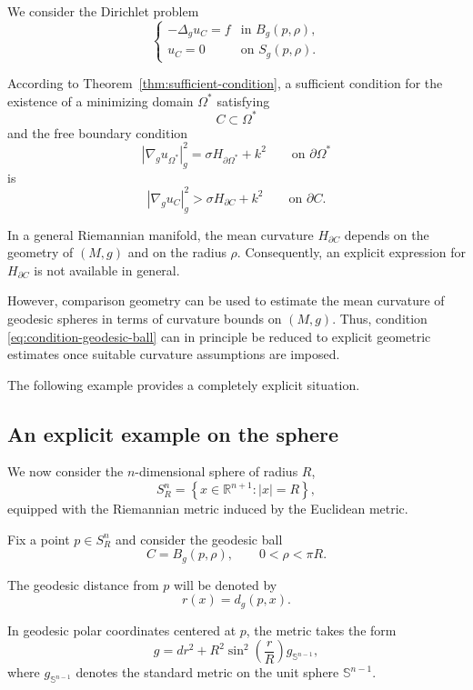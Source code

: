\documentclass{article}
\begin{document}
We consider the Dirichlet problem
\begin{equation}
\begin{cases}
-\Delta_g u_C=f & \text{in }B_g(p,\rho),\\
u_C=0 & \text{on }S_g(p,\rho).
\end{cases}
\label{eq:dirichlet-geodesic-ball}
\end{equation}

According to Theorem~\ref{thm:sufficient-condition}, a sufficient
condition for the existence of a minimizing domain
$\Omega^\ast$ satisfying
\[
C\subset\Omega^\ast
\]
and the free boundary condition
\[
|\nabla_g u_{\Omega^\ast}|_g^2
=
\sigma H_{\partial\Omega^\ast}+k^2
\qquad\text{on }\partial\Omega^\ast
\]
is
\begin{equation}
|\nabla_g u_C|_g^2
>
\sigma H_{\partial C}+k^2
\qquad\text{on }\partial C.
\label{eq:condition-geodesic-ball}
\end{equation}

In a general Riemannian manifold, the mean curvature
$H_{\partial C}$ depends on the geometry of $(M,g)$ and on the radius
$\rho$. Consequently, an explicit expression for
$H_{\partial C}$ is not available in general.

However, comparison geometry can be used to estimate the mean curvature
of geodesic spheres in terms of curvature bounds on $(M,g)$. Thus,
condition \eqref{eq:condition-geodesic-ball} can in principle be reduced
to explicit geometric estimates once suitable curvature assumptions are
imposed.

The following example provides a completely explicit situation.

\subsection{An explicit example on the sphere}
\label{subsec:sphere-example}

We now consider the $n$-dimensional sphere of radius $R$,
\[
S_R^n
=
\left\{
x\in\mathbb{R}^{n+1}:|x|=R
\right\},
\]
equipped with the Riemannian metric induced by the Euclidean metric.

Fix a point $p\in S_R^n$ and consider the geodesic ball
\[
C=B_g(p,\rho),
\qquad
0<\rho<\pi R.
\]

The geodesic distance from $p$ will be denoted by
\[
r(x)=d_g(p,x).
\]

In geodesic polar coordinates centered at $p$, the metric takes the form
\begin{equation}
g
=
dr^2
+
R^2\sin^2\left(\frac{r}{R}\right)
g_{\mathbb{S}^{n-1}},
\label{eq:sphere-polar-metric}
\end{equation}
where $g_{\mathbb{S}^{n-1}}$ denotes the standard metric on the unit
sphere $\mathbb{S}^{n-1}$.
\end{document}
